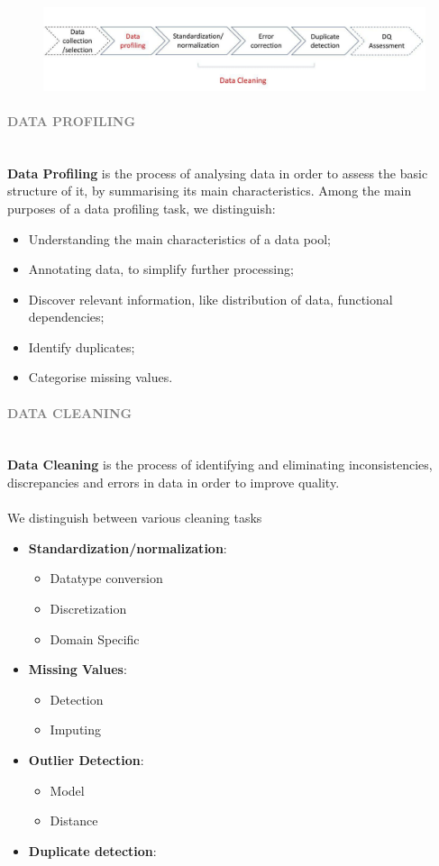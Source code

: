 \documentclass[10pt,a4paper]{article}
\newcommand{\nline}{\\~\\}
\newcommand{\myparagraph}[1]{\paragraph{\normalsize{\textcolor{gray}{\uppercase{\textbf{#1}}}} }\mbox{} \vspace{0.5em}\\}
\begin{document}
\begin{justify}
\begin{figure}[htp]
\centering
\includegraphics[width=.4\textwidth]{images/dataclean.jpg}\hfill
\end{figure}

\myparagraph{Data Profiling}
\textbf{Data Profiling} is the process of analysing data in order to assess the basic structure of it, by summarising its main characteristics. Among the main purposes of a data profiling task, we distinguish:
\begin{itemize}
    \item Understanding the main characteristics of a data pool;
    \item Annotating data, to simplify further processing;
    \item Discover relevant information, like distribution of data, functional dependencies;
    \item Identify duplicates;
    \item Categorise missing values.
\end{itemize}
\myparagraph{Data Cleaning}
\textbf{Data Cleaning} is the process of identifying and eliminating inconsistencies, discrepancies and errors in data in order to improve quality. \nline
We distinguish between various cleaning tasks
\begin{itemize}
	\item \textbf{Standardization/normalization}:
	\begin{itemize}
		\item Datatype conversion
		\item Discretization
		\item Domain Specific
	\end{itemize}
	\item \textbf{Missing Values}:
	\begin{itemize}
		\item Detection
		\item Imputing
	\end{itemize}
	\item \textbf{Outlier Detection}:
	\begin{itemize}
		\item Model
		\item Distance
	\end{itemize}
	\item \textbf{Duplicate detection}:
	\begin{itemize}

\end{itemize}
\end{itemize}
\end{justify}
\end{document}
